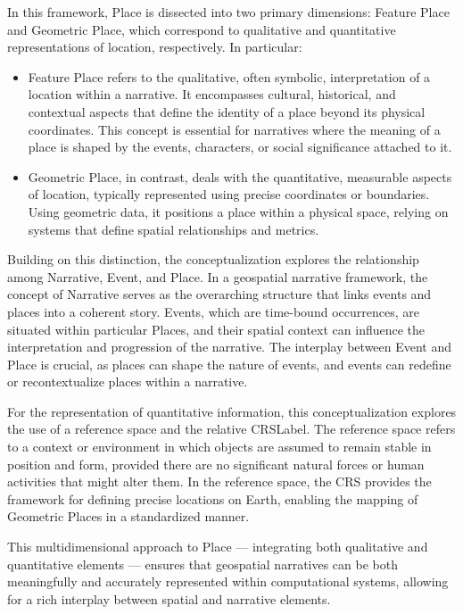 In this framework, Place is dissected into two primary dimensions: Feature Place and Geometric Place, which correspond to qualitative and quantitative representations of location, respectively. In particular:

\begin{itemize}
    \item Feature Place refers to the qualitative, often symbolic, interpretation of a location within a narrative. It encompasses cultural, historical, and contextual aspects that define the identity of a place beyond its physical coordinates. This concept is essential for narratives where the meaning of a place is shaped by the events, characters, or social significance attached to it.
    \item Geometric Place, in contrast, deals with the quantitative, measurable aspects of location, typically represented using precise coordinates or boundaries. Using geometric data, it positions a place within a physical space, relying on systems that define spatial relationships and metrics.
\end{itemize}

Building on this distinction, the conceptualization explores the relationship among Narrative, Event, and Place. In a geospatial narrative framework, the concept of Narrative serves as the overarching structure that links events and places into a coherent story. Events, which are time-bound occurrences, are situated within particular Places, and their spatial context can influence the interpretation and progression of the narrative. The interplay between Event and Place is crucial, as places can shape the nature of events, and events can redefine or recontextualize places within a narrative.

For the representation of quantitative information, this conceptualization explores the use of a reference space and the relative \acrfull{CRSLabel}. The reference space refers to a context or environment in which objects are assumed to remain stable in position and form, provided there are no significant natural forces or human activities that might alter them. In the reference space, the CRS provides the framework for defining precise locations on Earth, enabling the mapping of Geometric Places in a standardized manner.

This multidimensional approach to Place — integrating both qualitative and quantitative elements — ensures that geospatial narratives can be both meaningfully and accurately represented within computational systems, allowing for a rich interplay between spatial and narrative elements.

